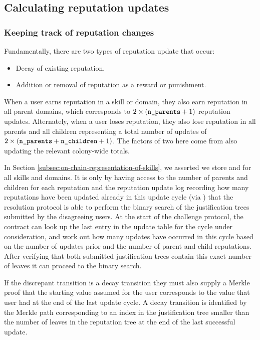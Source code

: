 \subsection{Calculating reputation updates}\label{sec:calculating-reputation-updates}

\subsubsection{Keeping track of reputation changes}

Fundamentally, there are two types of reputation update that occur:
\begin{itemize}
 \item Decay of existing reputation.
 \item Addition or removal of reputation as a reward or punishment.
\end{itemize}

When a user earns reputation in a skill or domain, they also earn reputation in all parent domains, which corresponds to $2\times\left(\texttt{n\_parents}+1\right)$ reputation updates. Alternately, when a user loses reputation, they also lose reputation in all parents and all children representing a total number of updates of $2\times\left(\texttt{n\_parents} + \texttt{n\_children} + 1\right)$. The factors of two here come from also updating the relevant colony-wide totals.

In Section \ref{subsec:on-chain-representation-of-skills}, we asserted we store  and  for all skills and domains. It is only by having access to the number of parents and children for each reputation and the reputation update log recording how many reputations have been updated already in this update cycle (via ) that the resolution protocol is able to perform the binary search of the justification trees submitted by the disagreeing users. At the start of the challenge protocol, the contract can look up the last entry in the update table for the cycle under consideration, and work out how many updates have occurred in this cycle based on the number of updates prior and the number of parent and child reputations. After verifying that both submitted justification trees contain this exact number of leaves it can proceed to the binary search.

If the discrepant transition is a decay transition they must also supply a Merkle proof that the starting value assumed for the user corresponds to the value that user had at the end of the last update cycle. A decay transition is identified by the Merkle path corresponding to an index in the justification tree smaller than the number of leaves in the reputation tree at the end of the last successful update.

